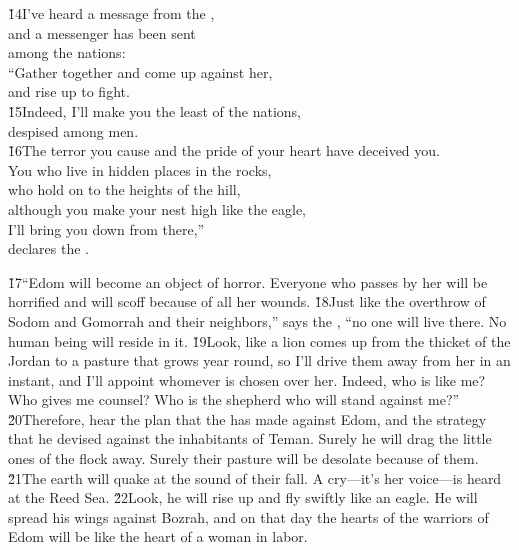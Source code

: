 \begin{poetry}
\poeml \v{14}I've heard a message from the , \\
\poemll    and a messenger has been sent \\
\poemlll       among the nations: \\
\poeml ``Gather together and come up against her, \\
\poemll    and rise up to fight. \\
\poeml \v{15}Indeed, I'll make you the least of the nations, \\
\poemll    despised among men. \\
\poeml \v{16}The terror you cause and the pride of your heart have deceived you. \\
\poeml You who live in hidden places in the rocks, \\
\poemll    who hold on to the heights of the hill, \\
\poeml although you make your nest high like the eagle, \\
\poemll    I'll bring you down from there,'' \\
\poemlll       declares the .
\end{poetry}

\v{17}``Edom will become an object of horror. Everyone who passes by her will be horrified and will scoff because of all her wounds. \v{18}Just like the overthrow of Sodom and Gomorrah and their neighbors,'' says the , ``no one will live there. No human being will reside in it. \v{19}Look, like a lion comes up from the thicket of the Jordan to a pasture that grows year round, so I'll drive them away from her in an instant, and I'll appoint whomever is chosen over her. Indeed, who is like me? Who gives me counsel? Who is the shepherd who will stand against me?'' \v{20}Therefore, hear the plan that the  has made against Edom, and the strategy that he devised against the inhabitants of Teman. Surely he will drag the little ones of the flock away. Surely their pasture will be desolate because of them. \v{21}The earth will quake at the sound of their fall. A cry---it's her voice---is heard at the Reed Sea. \v{22}Look, he will rise up and fly swiftly like an eagle. He will spread his wings against Bozrah, and on that day the hearts of the warriors of Edom will be like the heart of a woman in labor.

